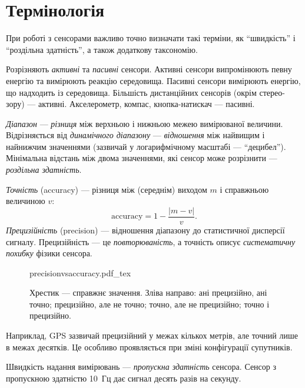 \section{Термінологія}\label{sec:sensors:terminology}

При роботі з сенсорами важливо точно визначати такі терміни, як ``швидкість'' і ``роздільна здатність'', а також додаткову таксономію.

Розрізняють \emph{активні} та \emph{пасивні} сенсори. Активні сенсори випромінюють певну енергію та вимірюють реакцію середовища. Пасивні сенсори вимірюють енергію, що надходить із середовища. Більшість дистанційних сенсорів (окрім стерео-зору) — активні. Акселерометр, компас, кнопка-натискач — пасивні.

\emph{Діапазон} — \emph{різниця} між верхньою і нижньою межею вимірюваної величини. Відрізняється від \emph{динамічного діапазону} — \emph{відношення} між найвищим і найнижчим значеннями (зазвичай у логарифмічному масштабі — ``децибел''). Мінімальна відстань між двома значеннями, які сенсор може розрізнити — \emph{роздільна здатність}.

\emph{Точність} (accuracy) — різниця між (середнім) виходом $m$ і справжньою величиною $v$:
\begin{equation}
\text{accuracy} = 1 - \frac{|m-v|}{v}.
\end{equation}
\emph{Прецизійність} (precision) — відношення діапазону до статистичної дисперсії сигналу. Прецизійність — це \emph{повторюваність}, а точність описує \emph{систематичну похибку} фізики сенсора.
\begin{figure}
    \centering
    \def\svgwidth{0.9\textwidth}
    {precisionvsaccuracy.pdf_tex}
    \caption{Хрестик — справжнє значення. Зліва направо: ані прецизійно, ані точно; прецизійно, але не точно; точно, але не прецизійно; точно і прецизійно. \label{fig:precision}}
\end{figure}
Наприклад, GPS зазвичай прецизійний у межах кількох метрів, але точний лише в межах десятків. Це особливо проявляється при зміні конфігурації супутників.

Швидкість надання вимірювань — \emph{пропускна здатність} сенсора. Сенсор з пропускною здатністю 10~Гц дає сигнал десять разів на секунду.

